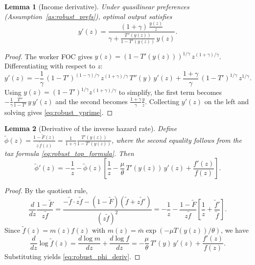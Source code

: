 \documentclass[12pt,a4paper]{article}
\theoremstyle{definition}
\theoremstyle{plain}
\newtheorem{lemma}{Lemma}[section]
\theoremstyle{remark}
\begin{document}
\begin{lemma}[Income derivative]
\label{lem:robust_yprime}
Under quasilinear preferences (Assumption~\ref{as:robust_prefs}), optimal output satisfies
\begin{equation}
\label{eq:robust_yprime}
  y'(z) = \frac{(1+\gamma)\, \frac{y(z)}{z}}{\gamma + \frac{T''(y(z))}{1 - T'(y(z))}\, y(z)}.
\end{equation}
\end{lemma}

\begin{proof}
The worker FOC gives $y(z) = (1-T'(y(z)))^{1/\gamma}\, z^{(1+\gamma)/\gamma}$. Differentiating with respect to $z$:
\[
  y'(z) = -\frac{1}{\gamma}\, (1-T')^{(1-\gamma)/\gamma}\, z^{(1+\gamma)/\gamma}\, T''(y)\, y'(z)
  + \frac{1+\gamma}{\gamma}\, (1-T')^{1/\gamma}\, z^{1/\gamma}.
\]
Using $y(z) = (1-T')^{1/\gamma} z^{(1+\gamma)/\gamma}$ to simplify, the first term becomes $-\frac{1}{\gamma}\frac{T''}{1-T'}\, y\, y'(z)$ and the second becomes $\frac{1+\gamma}{\gamma}\frac{y}{z}$. Collecting $y'(z)$ on the left and solving gives \eqref{eq:robust_yprime}.
\end{proof}

\begin{lemma}[Derivative of the inverse hazard rate]
\label{lem:robust_phi}
Define $\widetilde{\phi}(z) = \frac{1 - \widetilde{F}(z)}{z\,\widetilde{f}(z)} = \frac{1}{1+\gamma}\frac{T'(y(z))}{1-T'(y(z))}$, where the second equality follows from the tax formula \eqref{eq:robust_top_formula}. Then
\begin{equation}
\label{eq:robust_phi_deriv}
  \widetilde{\phi}'(z) = -\frac{1}{z} - \widetilde{\phi}(z)\left[\frac{1}{z} - \frac{\mu}{\theta}\, T'(y(z))\, y'(z) + \frac{f'(z)}{f(z)}\right].
\end{equation}
\end{lemma}

\begin{proof}
By the quotient rule,
\[
  \frac{d}{dz}\frac{1 - \widetilde{F}}{z\widetilde{f}}
  = \frac{-\widetilde{f}\cdot z\widetilde{f} - (1 - \widetilde{F})(\widetilde{f} + z\widetilde{f}')}{(z\widetilde{f})^2}
  = -\frac{1}{z} - \frac{1-\widetilde{F}}{z\widetilde{f}}\left[\frac{1}{z} + \frac{\widetilde{f}'}{\widetilde{f}}\right].
\]
Since $\widetilde{f}(z) = m(z) f(z)$ with $m(z) = \bar{m}\exp(-\mu T(y(z))/\theta)$, we have
\[
  \frac{d}{dz}\log\widetilde{f}(z) = \frac{d\log m}{dz} + \frac{d\log f}{dz}
  = -\frac{\mu}{\theta}\, T'(y)\, y'(z) + \frac{f'(z)}{f(z)}.
\]
Substituting yields \eqref{eq:robust_phi_deriv}.
\end{proof}
\end{document}
